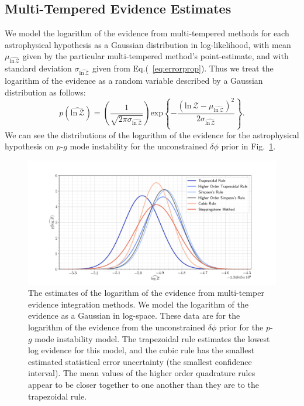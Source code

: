 \subsection{Multi-Tempered Evidence Estimates}\label{sec:ti_ssa_performance}
We model the logarithm of the evidence from multi-tempered methods for each astrophysical hypothesis as a Gaussian distribution in log-likelihood, with mean $\mu_{\widehat{\mathrm{ln} \, \mathcal{Z}}}$ given by the particular multi-tempered method's point-estimate, and with standard deviation $\sigma_{\widehat{\mathrm{ln} \, \mathcal{Z}}}$ given from Eq.(~\ref{eq:errorprop}). Thus we treat the logarithm of the evidence as a random variable described by a Gaussian distribution as follows:
\begin{equation}\label{eqn:p_log_z}
    p(\widehat{\mathrm{ln} \, \mathcal{Z}}) = \left(\frac{1}{\sqrt{2 \pi \sigma_{\widehat{\mathrm{ln} \, \mathcal{Z}}}}} \right) \mathrm{exp} \left \{-\frac{\left(\mathrm{ln} \, \mathcal{Z} - \mu_{\widehat{\mathrm{ln} \, \mathcal{Z}}}\right)^2} {2 \sigma_{\widehat{\mathrm{ln} \, \mathcal{Z}}}}  \right\}.
\end{equation}
We can see the distributions of the logarithm of the evidence for the astrophysical hypothesis on $p$-$g$ mode instability for the unconstrained $\delta \phi$ prior in Fig.~\ref{fig:lvc_sim_log_evidence_distr}.

\begin{figure}[th]
\centering
\includegraphics[width=1.0\textwidth]{figs/chapter6/multi_temper_log_z_lsc_sim.png}
\caption{The estimates of the logarithm of the evidence from multi-temper evidence integration methods. We model the logarithm of the evidence as a Gaussian in log-space. These data are for the logarithm of the evidence from the unconstrained $\delta \phi$ prior for the $p$-$g$ mode instability model. The trapezoidal rule estimates the lowest log evidence for this model, and the cubic rule has the smallest estimated statistical error uncertainty (the smallest confidence interval). The mean values of the higher order quadrature rules appear to be closer together to one another than they are to the trapezoidal rule.}
\label{fig:lvc_sim_log_evidence_distr}
\end{figure}

